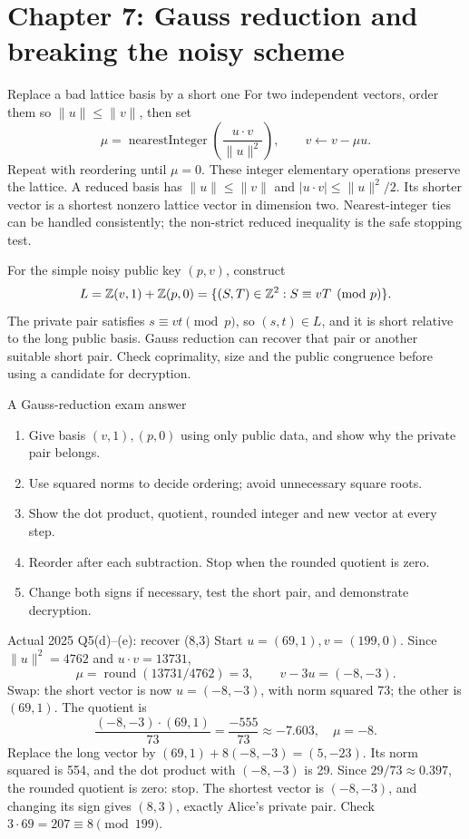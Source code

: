 \documentclass[11pt,a4paper]{article}
\begin{document}
\section{Chapter 7: Gauss reduction and breaking the noisy scheme}
\begin{concept}{Replace a bad lattice basis by a short one}
For two independent vectors, order them so \(\|u\|\le\|v\|\), then set
\[\mu=\operatorname{nearestInteger}\!\left(\frac{u\cdot v}{\|u\|^2}\right),\qquad v\leftarrow v-\mu u.\]
Repeat with reordering until \(\mu=0\). These integer elementary operations preserve the lattice. A reduced basis has \(\|u\|\le\|v\|\) and \(|u\cdot v|\le\|u\|^2/2\). Its shorter vector is a shortest nonzero lattice vector in dimension two. Nearest-integer ties can be handled consistently; the non-strict reduced inequality is the safe stopping test.

For the simple noisy public key \((p,v)\), construct
\[L=\mathbb Z(v,1)+\mathbb Z(p,0)=\{(S,T)\in\mathbb Z^2:S\equiv vT\pmod p\}.\]
The private pair satisfies \(s\equiv vt\pmod p\), so \((s,t)\in L\), and it is short relative to the long public basis. Gauss reduction can recover that pair or another suitable short pair. Check coprimality, size and the public congruence before using a candidate for decryption.
\end{concept}
\begin{method}{A Gauss-reduction exam answer}
\begin{enumerate}
\item Give basis \((v,1),(p,0)\) using only public data, and show why the private pair belongs.
\item Use squared norms to decide ordering; avoid unnecessary square roots.
\item Show the dot product, quotient, rounded integer and new vector at every step.
\item Reorder after each subtraction. Stop when the rounded quotient is zero.
\item Change both signs if necessary, test the short pair, and demonstrate decryption.
\end{enumerate}
\end{method}
\begin{example}{Actual 2025 Q5(d)--(e): recover (8,3)}
Start \(u=(69,1),v=(199,0)\). Since \(\|u\|^2=4762\) and \(u\cdot v=13731\),
\[\mu=\operatorname{round}(13731/4762)=3,\qquad v-3u=(-8,-3).\]
Swap: the short vector is now \(u=(-8,-3)\), with norm squared 73; the other is \((69,1)\). The quotient is
\[\frac{(-8,-3)\cdot(69,1)}{73}=\frac{-555}{73}\approx-7.603,\quad\mu=-8.\]
Replace the long vector by \((69,1)+8(-8,-3)=(5,-23)\). Its norm squared is 554, and the dot product with \((-8,-3)\) is 29. Since \(29/73\approx0.397\), the rounded quotient is zero: stop. The shortest vector is \((-8,-3)\), and changing its sign gives \((8,3)\), exactly Alice's private pair. Check \(3\cdot69=207\equiv8\pmod{199}\).
\end{example}
\end{document}
